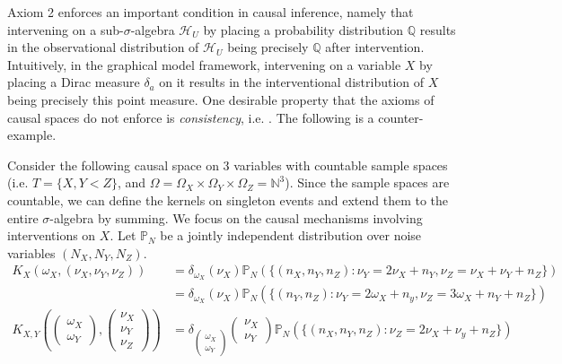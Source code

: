 \documentclass[../main.tex]{subfiles}
\begin{document}
    Axiom 2 enforces an important condition in causal inference, namely that intervening on a sub-${\sigma}$-algebra ${\mathcal{H}_U}$ by placing a probability distribution ${\mathbb{Q}}$ results in the observational distribution of ${\mathcal{H}_U}$ being precisely ${\mathbb{Q}}$ after intervention. Intuitively, in the graphical model framework, intervening on a variable ${X}$ by placing a Dirac measure ${\delta_a}$ on it results in the interventional distribution of ${X}$ being precisely this point measure. One desirable property that the axioms of causal spaces do not enforce is \emph{consistency}, i.e.  . The following is a counter-example. 
    \begin{ex}
    \label{ex:Causal-space-that-fails-compositionality}
        Consider the following causal space on ${3}$ variables with countable sample  spaces  (i.e. ${T=\{X,Y<Z\}}$, and ${\Omega = \Omega_X\times\Omega_Y\times\Omega_Z = \mathbb{N}^3}$). Since the sample spaces are countable, we can define the kernels on singleton events and extend them to the entire ${\sigma}$-algebra by summing. We focus on the causal mechanisms involving interventions on ${X}$.  Let ${\mathbb{P}_N}$ be a jointly independent distribution over noise variables ${(N_X, N_Y, N_Z)}$. 
        \begin{align*}
            K_X(\omega_X, (\nu_X,\nu_Y,\nu_Z )) &= \delta_{\omega_X}(\nu_X)\mathbb{P}_N(\{(n_X, n_Y,n_Z): \nu_Y = 2\nu_X+n_Y, \nu_Z = \nu_X+\nu_Y+n_Z \})\\
            &= \delta_{\omega_X}(\nu_X)\mathbb{P}_N(\{(n_Y,n_Z): \nu_Y = 2\omega_X+n_y, \nu_Z = 3\omega_X+n_Y+n_Z \})\\
            K_{X,Y}(\begin{pmatrix}
                \omega_X\\ \omega_Y
            \end{pmatrix}, \begin{pmatrix}
                \nu_X\\ \nu_Y \\ \nu_Z
            \end{pmatrix}) &= \delta_{\begin{pmatrix}
                \omega_X\\ \omega_Y
            \end{pmatrix}}\begin{pmatrix}
                \nu_X\\ \nu_Y
            \end{pmatrix}\mathbb{P}_N(\{(n_X, n_Y,n_Z): \nu_Z = 2\nu_X+\nu_y+n_Z \})\\

\end{align*}
\end{ex}
\end{document}
